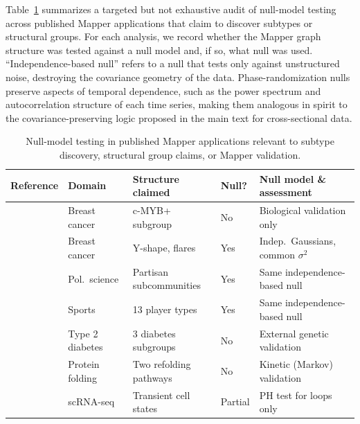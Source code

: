 \documentclass[hidelinks]{siamart251216}
\begin{document}
Table~\ref{tab:null-audit-sm} summarizes a targeted but not exhaustive
audit of null-model testing across published Mapper applications that
claim to discover subtypes or structural groups.  For each analysis, we record whether the Mapper graph
structure was tested against a null model and, if so, what null was
used.  ``Independence-based null'' refers to a null that tests only
against unstructured noise, destroying the covariance geometry of the
data.  Phase-randomization nulls preserve aspects of temporal dependence,
such as the power spectrum and autocorrelation structure of each time
series, making them analogous in spirit to the covariance-preserving
logic proposed in the main text for cross-sectional data.

\begin{table}[ht]
\centering
\scriptsize
\caption{Null-model testing in published Mapper applications relevant
to subtype discovery, structural group claims, or Mapper validation.}
\label{tab:null-audit-sm}
\begin{tabular}{@{}lllll@{}}
\toprule
\textbf{Reference} & \textbf{Domain} & \textbf{Structure claimed} & \textbf{Null?} & \textbf{Null model \& assessment} \\
\midrule

\cite{Nicolau2011}
  & Breast cancer
  & c-MYB+ subgroup
  & No
  & Biological validation only \\[4pt]

\cite{Lum2013}
  & Breast cancer
  & Y-shape, flares
  & Yes
  & Indep.\ Gaussians, common $\sigma^2$ \\[4pt]

\cite{Lum2013}
  & Pol.\ science
  & Partisan subcommunities
  & Yes
  & Same independence-based null \\[4pt]

\cite{Lum2013}
  & Sports
  & 13 player types
  & Yes
  & Same independence-based null \\[4pt]

\cite{Li2015}
  & Type 2 diabetes
  & 3 diabetes subgroups
  & No
  & External genetic validation \\[4pt]

\cite{Yao2009}
  & Protein folding
  & Two refolding pathways
  & No
  & Kinetic (Markov) validation \\[4pt]

\cite{Rizvi2017}
  & scRNA-seq
  & Transient cell states
  & Partial
  & PH test for loops only \\[4pt]


\end{tabular}
\end{table}
\end{document}
